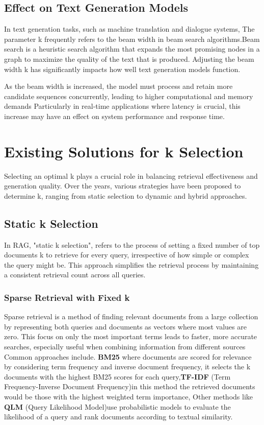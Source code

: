 \subsection {Effect on Text Generation Models}
In text generation tasks, such as machine translation and dialogue systems, The parameter k frequently refers to the beam width in beam search algorithms\citep{freitag-al-onaizan-2017-beam}.Beam search is a heuristic search algorithm that expands the most promising nodes in a graph to maximize the quality of the text that is produced. Adjusting the beam width k has significantly impacts how well text generation models function.

As the beam width is increased, the model must process and retain more candidate sequences concurrently, leading to higher computational and memory demands Particularly in real-time applications where latency is crucial\citep{tensorrt_llm_beam_search}, this increase may have an effect on system performance and response time.

\section{Existing Solutions for k Selection}
Selecting an optimal k plays a crucial role in balancing retrieval effectiveness and generation quality. Over the years, various strategies have been proposed to determine k, ranging from static selection to dynamic and hybrid approaches.
\subsection{Static k Selection}
In RAG, "static k selection", refers to the process of setting a fixed number of top documents k to retrieve for every query, irrespective of how simple or complex the query might be. This approach simplifies the retrieval process by maintaining a consistent retrieval count across all queries.

\subsubsection{Sparse Retrieval with Fixed k} 
Sparse retrieval is a method of finding relevant documents from a large collection by representing both queries and documents as vectors where most values are zero\citep{zheng2024enhancing}. This focus on only the most important terms leads to faster, more accurate searches, especially useful when combining information from different sources 
Common approaches include. \textbf{BM25}\citep{10.1561/1500000019} where documents are scored for relevance by considering term frequency and inverse document frequency, it selects the k documents with the highest BM25 scores for each query,\textbf{TF-IDF} (Term Frequency-Inverse Document Frequency)\citep{gfg2025tfidf}in this method the retrieved documents would be those with the highest weighted term importance, Other methods like \textbf{QLM }(Query Likelihood Model)\citep{10.1007/978-3-030-72240-1_49}use probabilistic models to evaluate the likelihood of a query and rank documents according to textual similarity.

